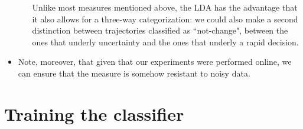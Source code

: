 \documentclass{article}
\begin{document}
\begin{itemize}
\begin{itemize}
Unlike most measures mentioned above, the LDA has the advantage that it also allows for a three-way categorization: we could also make a second distinction between trajectories classified as ``not-change", between the ones that underly uncertainty and the ones that underly a rapid decision. 

\end{itemize}

\item Note, moreover, that given that our experiments were performed online, we can ensure that the measure is somehow resistant to noisy data.

\end{itemize}

\section{Training the classifier}
\end{document}
